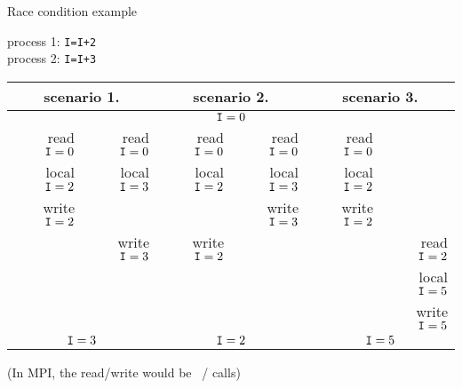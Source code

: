 \begin{numberedframe}{Race condition example}
  \scriptsize
  \begin{tabbing}
    process 1: \texttt{I=I+2}\\
    process 2: \texttt{I=I+3}
  \end{tabbing}
  \begin{tabular}{|rr|rr|rr|}
    \hline
    \multicolumn{2}{|c|}{scenario 1.}& \multicolumn{2}{|c|}{scenario 2.}&
    \multicolumn{2}{|c|}{scenario 3.}\\ \hline
    \multicolumn{6}{|c|}{$\n{I}=0$}\\ \hline
    read $\n{I}=0$&read $\n{I}=0$&
    read $\n{I}=0$&read $\n{I}=0$&
    read $\n{I}=0$& \\
    local $\n{I}=2$&local $\n{I}=3$& 
    local $\n{I}=2$&local $\n{I}=3$&
    local $\n{I}=2$& \\
    write $\n{I}=2$& & &write $\n{I}=3$&write $\n{I}=2$& \\
    &write $\n{I}=3$&write $\n{I}=2$& & &read $\n{I}=2$\\
    &&&&&local $\n{I}=5$\\
    &&&&&write $\n{I}=5$\\
    \hline
    \multicolumn{2}{|c|}{$\n{I}=3$}& \multicolumn{2}{|c|}{$\n{I}=2$}&
    \multicolumn{2}{|c|}{$\n{I}=5$}\\ \hline
  \end{tabular}

  (In MPI, the read/write would be ~/  calls)
\end{numberedframe}

